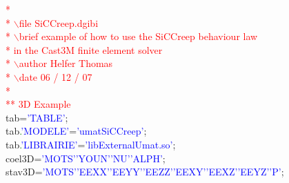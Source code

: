 \noindent
\textcolor{red}{*}\\
\textcolor{red}{* $\backslash$file   SiCCreep.dgibi}\\
\textcolor{red}{* $\backslash$brief  example of how to use the SiCCreep behaviour law}\\
\textcolor{red}{* in the Cast3M finite element solver}\\
\textcolor{red}{* $\backslash$author Helfer Thomas}\\
\textcolor{red}{* $\backslash$date   06 / 12 / 07}\\
\textcolor{red}{*}\\
\newline
\textcolor{red}{** 3D Example}\\
\newline
tab\hspace*{1em}=\hspace*{1em}\textcolor{blue}{'TABLE'};\\
tab\textcolor{green}{.}\textcolor{blue}{'MODELE'}\hspace*{1em}\hspace*{1em}\hspace*{1em}=\hspace*{1em}\textcolor{blue}{'umatSiCCreep'};\\
tab\textcolor{green}{.}\textcolor{blue}{'LIBRAIRIE'}\hspace*{1em}=\hspace*{1em}\textcolor{blue}{'libExternalUmat.so'};\\
\newline
coel3D\hspace*{1em}=\hspace*{1em}\textcolor{blue}{'MOTS'}\hspace*{1em}\textcolor{blue}{'YOUN'}\hspace*{1em}\textcolor{blue}{'NU'}\hspace*{1em}\textcolor{blue}{'ALPH'};\\
stav3D\hspace*{1em}=\hspace*{1em}\textcolor{blue}{'MOTS'}\hspace*{1em}\textcolor{blue}{'EEXX'}\hspace*{1em}\textcolor{blue}{'EEYY'}\hspace*{1em}\textcolor{blue}{'EEZZ'}\hspace*{1em}\textcolor{blue}{'EEXY'}\hspace*{1em}\textcolor{blue}{'EEXZ'}\hspace*{1em}\textcolor{blue}{'EEYZ'}\hspace*{1em}\hspace*{1em}\textcolor{blue}{'P'};\\
